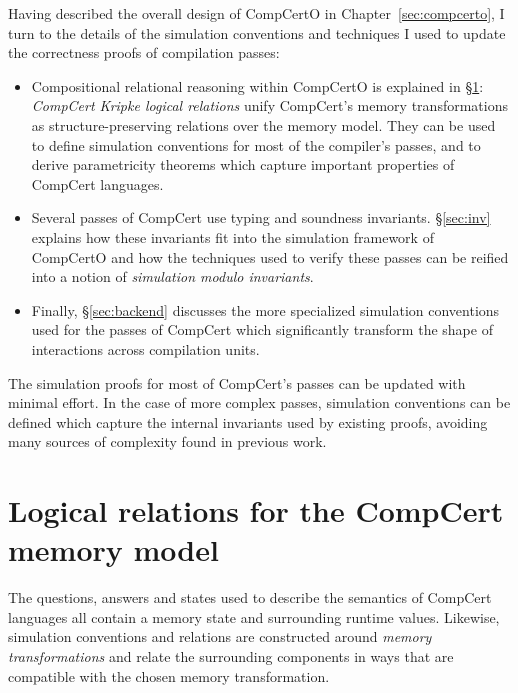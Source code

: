 \documentclass[11pt,oneside,draft]{book}
\theoremstyle{definition}
\newcommand{\kw}[1]{\ensuremath{ \mathsf{#1} }}
\begin{document}
Having described the overall design of CompCertO
in Chapter~\ref{sec:compcerto},
I turn to the details of the simulation conventions and techniques
I used to update the correctness proofs
of compilation passes:
\begin{itemize}
\item
  Compositional relational reasoning within CompCertO
  is explained in \S\ref{sec:cklr}:
  \emph{CompCert Kripke logical relations}
  unify CompCert's memory transformations
  as structure-preserving relations
  over the memory model.
  They can be used to define simulation conventions
  for most of the compiler's passes,
  and to derive parametricity theorems which capture
  important properties of CompCert languages.
\item
  Several passes of CompCert use
  typing and soundness invariants.
  \S\ref{sec:inv} explains how these invariants fit
  into the simulation framework of CompCertO and
  how the techniques used to verify these passes
  can be reified into a notion of
  \emph{simulation modulo invariants}.
\item
  Finally, \S\ref{sec:backend}
  discusses the more specialized simulation conventions
  used for the passes of CompCert which significantly transform
  the shape of interactions across compilation units.
\end{itemize}

The simulation proofs for
most of CompCert's passes
can be updated with minimal effort.
In the case of more complex passes,
simulation conventions can be defined
which capture the internal invariants
used by existing proofs,
avoiding many sources of complexity found
in previous work.

\section{Logical relations for the CompCert memory model} \label{sec:cklr} %

The questions, answers and states
used to describe the semantics of CompCert languages all contain
a memory state and surrounding runtime values.
Likewise, simulation conventions and relations
are constructed around \emph{memory transformations}
and relate the surrounding components in ways that %
are compatible with the chosen memory transformation.

\end{document}
